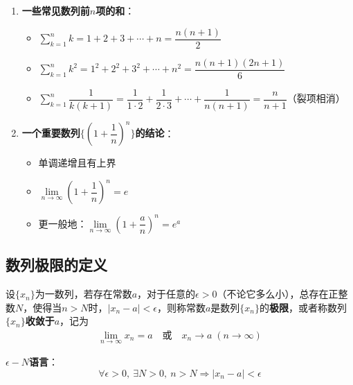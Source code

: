 \documentclass[a4paper,12pt]{article}
\begin{document}
\begin{enumerate}
        \item \textbf{一些常见数列前$n$项的和}：
        \begin{itemize}
            \item $\displaystyle\sum_{k=1}^{n} k = 1 + 2 + 3 + \cdots + n = \dfrac{n(n+1)}{2}$
            \item $\displaystyle\sum_{k=1}^{n} k^2 = 1^2 + 2^2 + 3^2 + \cdots + n^2 = \dfrac{n(n+1)(2n+1)}{6}$
            \item $\displaystyle\sum_{k=1}^{n} \dfrac{1}{k(k+1)} = \dfrac{1}{1 \cdot 2} + \dfrac{1}{2 \cdot 3} + \cdots + \dfrac{1}{n(n+1)} = \dfrac{n}{n+1}$（裂项相消）
        \end{itemize}

        \item \textbf{一个重要数列$\{(1 + \dfrac{1}{n})^n\}$的结论}：
        \begin{itemize}
            \item 单调递增且有上界
            \item $\lim\limits_{n \to \infty} \left(1 + \dfrac{1}{n}\right)^n = e$
            \item 更一般地：$\lim\limits_{n \to \infty} \left(1 + \dfrac{a}{n}\right)^n = e^a$
        \end{itemize}
    \end{enumerate}

    \subsection{数列极限的定义}

    设$\{x_n\}$为一数列，若存在常数$a$，对于任意的$\epsilon > 0$（不论它多么小），总存在正整数$N$，使得当$n > N$时，$|x_n - a| < \epsilon$，则称常数$a$是数列$\{x_n\}$的\textbf{极限}，或者称数列$\{x_n\}$\textbf{收敛于}$a$，记为
    \begin{gather*}
        \lim_{n \to \infty} x_n = a \quad \text{或} \quad x_n \to a \;(n \to \infty)
    \end{gather*}

    \textbf{$\epsilon-N$语言}：
    \[
        \forall \epsilon > 0,\ \exists N > 0,\ n > N \Rightarrow |x_n - a| < \epsilon
    \]
\end{document}
